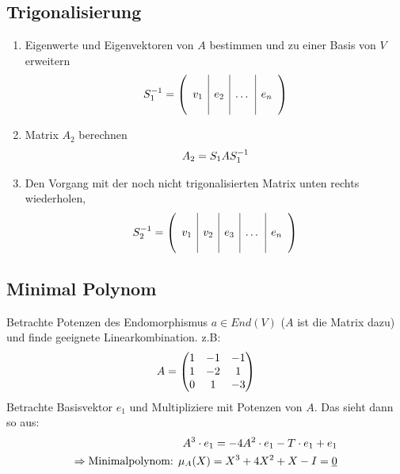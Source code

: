 \documentclass[ngerman,a4paper]{article}
\begin{document}
\subsection{Trigonalisierung}
\begin{enumerate}[label=\textbf{\arabic*.}]
	\item Eigenwerte und Eigenvektoren von $A$ bestimmen und zu einer Basis von $V$ erweitern
	\begin{align}
		S_1^{-1} = \left(\begin{array}{c|c|c|c}
		&&& \\
		v_1 & e_2 & \dots & e_n \\
		&&&
		\end{array}\right)\notag
	\end{align}
	\item Matrix $A_2$ berechnen
	\begin{align}
		A_2 = S_1AS_1^{-1}\notag
	\end{align}
	\item Den Vorgang mit der noch nicht trigonalisierten Matrix unten rechts wiederholen,
	\begin{align}
		S_2^{-1} = \left(\begin{array}{c|c|c|c|c}
		&&&& \\
		v_1 & v_2 & e_3 & \dots & e_n \\
		&&&&
		\end{array}\right)\notag
	\end{align}
\end{enumerate}

\subsection{Minimal Polynom}
Betrachte Potenzen des Endomorphismus $a \in End(V)$ ($A$ ist die Matrix dazu) und finde geeignete Linearkombination. z.B:
	\begin{align}
		A=\begin{pmatrix}
			1 & -1 & -1\\
			1 & -2 & 1\\
			0 & 1 & -3
		\end{pmatrix}\notag
	\end{align}
Betrachte Basisvektor $e_1$ und Multipliziere mit Potenzen von $A$. Das sieht dann so aus:
	\begin{align}
	A^3 \cdot e_1 = -4A^2\cdot e_1 - T\cdot e_1 + e_1\notag \\
	\Rightarrow \text{Minimalpolynom: } \mu_A (X) = X^3 + 4X^2+X -I = \underline{0}\notag
	\end{align}
\end{document}
